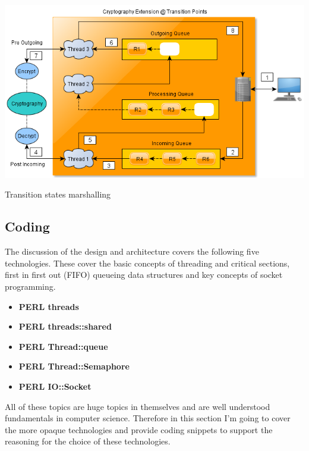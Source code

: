 {			\vspace{-3mm}
			\noindent\begin{minipage}{\textwidth}
				
				\begin{figurehere}
					\centering
					\includegraphics[scale=0.65]{pages/chapter3/figures/servertranitionstates.png}
					\caption{Transition states marshalling}
					\label{fig:Transitionstatesmarshalling}
				\end{figurehere}	
			
			\end{minipage}
		}
		

\newpage
		
	\subsection{Coding} 		
	
		\normalsize
		{
			The discussion of the design and architecture covers the following five technologies. These cover the basic concepts of threading and critical sections, first in first out (FIFO) queueing data structures
			and key concepts of socket programming. 
		}			
		
		\begin{itemize}[itemsep=1pt,parsep=1pt]
			\item \textbf{PERL threads}					
			\item \textbf{PERL threads::shared}				
			\item \textbf{PERL Thread::queue}	
			\item \textbf{PERL Thread::Semaphore}				
			\item \textbf{PERL IO::Socket}			
		\end{itemize}
			
					
		\normalsize
		{
			All of these topics are huge topics in themselves and are well understood fundamentals in computer science.  
			Therefore in this section I'm going to cover the more opaque technologies and provide coding snippets
			to support the reasoning for the choice of these technologies.
			\newline
		} 
		
